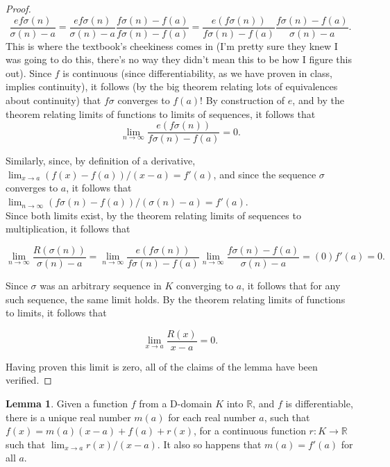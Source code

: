 \documentclass[11pt]{article}
\newcommand{\R}{\mathbb{R}}
\theoremstyle{definition}
\newtheorem{lemma}{Lemma}
\begin{document}
\begin{proof}
\[
\frac{ef\sigma(n)}{\sigma(n) - a} = \frac{ef\sigma(n)}{\sigma(n) - a}\frac{f\sigma(n) - f(a)}{f\sigma(n) - f(a)} = \frac{e(f\sigma(n))}{f\sigma(n) - f(a)}\frac{f\sigma(n) - f(a)}{\sigma(n) - a}.
\]
This is where the textbook's cheekiness comes in (I'm pretty sure they knew I was going to do this, there's no way they didn't mean this to be how I figure this out). Since $f$ is continuous (since differentiability, as we have proven in class, implies continuity), it follows (by the big theorem relating lots of equivalences about continuity) that $f\sigma$ converges to $f(a)$! By construction of $e$, and by the theorem relating limits of functions to limits of sequences, it follows that
\[
\lim_{n\to \infty}\frac{e(f\sigma(n))}{f\sigma(n) - f(a)} = 0.
\]

Similarly, since, by definition of a derivative, $\lim_{x\to a}(f(x) - f(a))/(x-a) = f'(a)$, and since the sequence $\sigma$ converges to $a$, it follows that $\lim_{n\to \infty}(f\sigma(n) - f(a))/(\sigma(n)-a) = f'(a)$. 
 \\
 
 Since both limits exist, by the theorem relating limits of sequences to multiplication, it follows that 
 
 \[\lim_{n\to \infty}\frac{R(\sigma(n))}{\sigma(n) - a} = \lim_{n\to \infty}\frac{e(f\sigma(n))}{f\sigma(n) - f(a)}\lim_{n\to \infty}\frac{f\sigma(n) - f(a)}{\sigma(n) - a} = (0)f'(a) = 0.
 \]
 
 Since $\sigma$ was an arbitrary sequence in $K$ converging to $a$, it follows that for any such sequence, the same limit holds. By the theorem relating limits of functions to limits, it follows that
 
 \[
 \lim_{x\to a}\frac{R(x)}{x-a} = 0.
 \]
 
 Having proven this limit is zero, all of the claims of the lemma have been verified.

\end{proof}


\begin{lemma}
Given a function $f$ from a D-domain $K$ into $\R$, and $f$ is differentiable, there is a unique real number $m(a)$ for each real number $a$, such that $f(x) = m(a)(x-a) + f(a) + r(x)$, for a continuous function $r: K\to \R$ such that $\lim_{x\to a}r(x)/(x-a)$. It also so happens that $m(a) = f'(a)$ for all $a$. 
\end{lemma}
\end{document}
